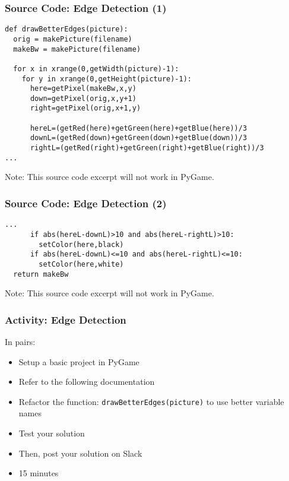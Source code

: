 
\begin{frame}[fragile]
	\frametitle{Source Code: Edge Detection (1)}
	
\begin{lstlisting}
def drawBetterEdges(picture):
  orig = makePicture(filename)
  makeBw = makePicture(filename)
  
  for x in xrange(0,getWidth(picture)-1):
    for y in xrange(0,getHeight(picture)-1):
      here=getPixel(makeBw,x,y)
      down=getPixel(orig,x,y+1)
      right=getPixel(orig,x+1,y)
      
      hereL=(getRed(here)+getGreen(here)+getBlue(here))/3
      downL=(getRed(down)+getGreen(down)+getBlue(down))/3
      rightL=(getRed(right)+getGreen(right)+getBlue(right))/3
...
\end{lstlisting}

Note: This source code excerpt will not work in PyGame.

\end{frame}

\begin{frame}[fragile]
	\frametitle{Source Code: Edge Detection (2)}
	
\begin{lstlisting}
...
      if abs(hereL-downL)>10 and abs(hereL-rightL)>10:
        setColor(here,black)
      if abs(hereL-downL)<=10 and abs(hereL-rightL)<=10:
        setColor(here,white)
  return makeBw
\end{lstlisting}

Note: This source code excerpt will not work in PyGame.

\end{frame}


\begin{frame}
	\frametitle{Activity: Edge Detection}
	
	In pairs:
	
	\vspace{2em}
	
	\begin{itemize}		
		\item Setup a basic project in PyGame
		\item Refer to the following documentation
		\item Refactor the function: \texttt{drawBetterEdges(picture)} to use better variable names
		\item Test your solution
		\item Then, post your solution on Slack
		\item 15 minutes
	\end{itemize}
\end{frame}

